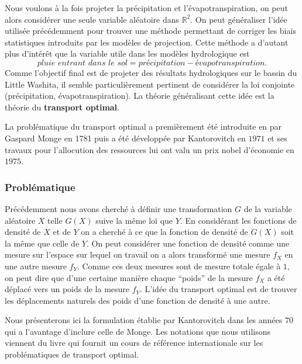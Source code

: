 \documentclass[a4paper,11pt]{article}
\begin{document}
Nous voulons à la fois projeter la précipitation et l'évapotranspiration, on peut alors considérer une seule variable aléatoire dans $\mathbb{R}^2$. On peut généraliser l'idée utilisée précédemment pour trouver une méthode permettant de corriger les biais statistiques introduits par les modèles de projection. Cette méthode a d'autant plus d'intérêt que la variable utile dans les modèles hydrologique est 
\[\textit{pluie entrant dans le sol}=\textit{précipitation}-\textit{évapotranspiration}.\]
Comme l'objectif final est de projeter des résultats hydrologiques sur le bassin du Little Washita, il semble particulièrement pertinent de considérer la loi conjointe (précipitation, évapotranspiration). La théorie généralisant cette idée est la théorie du \textbf{transport optimal}.

La problématique du transport optimal a premièrement été introduite en par Gaspard Monge en 1781 puis a été développée par Kantorovitch en $1971$ et ses travaux pour l'allocution des ressources lui ont valu un prix nobel d'économie en $1975$.

\subsubsection{Problématique}

Précédemment nous avons cherché à définir une transformation $G$ de la variable aléatoire $X$ telle $G(X)$ suive la même loi que $Y$. En considérant les fonctions de densité de $X$ et de $Y$ on a cherché à ce que la fonction de densité de $G(X)$ soit la même que celle de $Y$. On peut considérer une fonction de densité comme une mesure sur l'espace sur lequel on travail on a alors transformé une mesure $f_X$ en une autre mesure $f_Y$. Comme ces deux mesures sont de mesure totale égale à $1$, on peut dire que d'une certaine manière chaque ``poids'' de la mesure $f_X$ a été déplacé vers un poids de la mesure $f_Y$. L'idée du transport optimal est de trouver les déplacements naturels des poids d'une fonction de densité à une autre.  

Nous présenterons ici la formulation établie par Kantorovitch dans les années $70$ qui a l'avantage d'inclure celle de Monge. Les notations que nous utilisons viennent du livre \cite{villani2003topics} qui fournit un cours de référence internationale sur les problématiques de transport optimal. 

\vspace{0.7cm}
\end{document}

